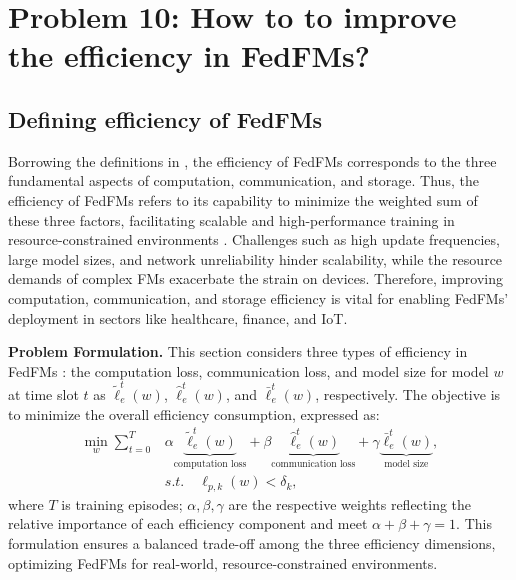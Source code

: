 \section{Problem 10: How to to improve the efficiency in FedFMs?}

\subsection{Defining efficiency of FedFMs}
Borrowing the definitions in \cite{yao2024federated}, the efficiency of FedFMs corresponds to the three fundamental aspects of computation, communication, and storage.
Thus, the efficiency of FedFMs refers to its capability to minimize the weighted sum of these three factors, facilitating scalable and high-performance training in resource-constrained environments \cite{chen2021communication, ren2024advances}. Challenges such as high update frequencies, large model sizes, and network unreliability hinder scalability, while the resource demands of complex FMs exacerbate the strain on devices. Therefore, improving computation, communication, and storage efficiency is vital for enabling FedFMs' deployment in sectors like healthcare, finance, and IoT. 

\textbf{Problem Formulation.} This section considers three types of efficiency in FedFMs \cite{mcmahan2017communication,wang2021resource, hu2021mhat}: the computation loss, communication  loss, and model size for model $w$ at time slot $t$ as $\tilde \ell_e^t(w)$, $\hat \ell_e^t(w)$, and $\bar \ell_e^t(w)$, respectively. The objective is to minimize the overall efficiency consumption, expressed as:
\begin{equation}
\label{eq:efficiency_FM}
\begin{split}
    \min_w\sum_{t=0}^{T}&\alpha \underbrace{\tilde \ell_e^t(w)}_{\text{computation loss}}+\beta \underbrace{\hat \ell_e^t(w)}_{\text{communication loss}} + \gamma  \underbrace{\bar\ell_e^t(w)}_{\text{model size}}, \\
    &s.t. \quad \ell_{p,k}(w) <\delta_k,
    \end{split}
\end{equation}
where $T$ is training episodes; $\alpha,\beta,\gamma$ are the respective weights reflecting the relative importance of each efficiency component and meet $\alpha+\beta+\gamma=1$. This formulation ensures a balanced trade-off among the three efficiency dimensions, optimizing FedFMs for real-world, resource-constrained environments.





